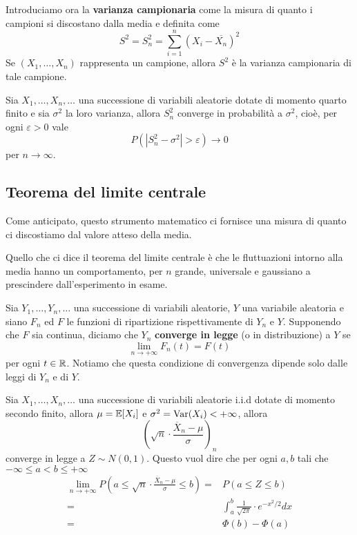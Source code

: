Introduciamo ora la \textbf{varianza campionaria} come la misura di quanto i campioni si
discostano dalla media e definita come
\[ S^2 = S_n^2 = \sum_{i=1}^n \left( X_i - \overline{X_n} \right)^2 \]
Se $(X_1, \dots, X_n)$ rappresenta un campione, allora $S^2$ è la varianza campionaria di tale
campione.

\begin{proposition}
	Sia $X_1, \dots, X_n, \dots$ una successione di variabili aleatorie dotate di momento quarto
	finito e sia $\sigma^2$ la loro varianza, allora $S_n^2$ converge in probabilità a $\sigma^2$,
	cioè, per ogni $\varepsilon > 0$ vale
	\[ P(|S_n^2 - \sigma^2| > \varepsilon) \to 0 \]
	per $n \to \infty$.
\end{proposition}

\subsection{Teorema del limite centrale}
Come anticipato, questo strumento matematico ci fornisce una misura di quanto ci discostiamo dal
valore atteso della media.

Quello che ci dice il teorema del limite centrale è che le fluttuazioni intorno alla media
hanno un comportamento, per $n$ grande, universale e gaussiano a prescindere dall'esperimento in
esame.

\begin{definition}
	Sia $Y_1, \dots, Y_n, \dots$ una successione di variabili aleatorie, $Y$ una variabile
	aleatoria e siano $F_n$ ed $F$ le funzioni di ripartizione rispettivamente di $Y_n$ e $Y$.
	Supponendo che $F$ sia continua, diciamo che $Y_n$ \textbf{converge in legge} (o in
	distribuzione) a $Y$ se
	\[ \lim_{n \to +\infty} F_n (t) = F(t) \]
	per ogni $t \in \mathbb{R}$. Notiamo che questa condizione di convergenza dipende solo dalle leggi di
	$Y_n$ e di $Y$.
\end{definition}

\begin{theorem}\label{th: tlc}
	Sia $X_1, \dots, X_n, \dots$ una successione di variabili aleatorie i.i.d dotate di momento
	secondo finito, allora $\mu = \mathbb{E}[X_i]$ e $\sigma^2 = \operatorname{Var}(X_i) < +\infty$, allora
	\[ \left( \sqrt{n} \cdot \frac{\overline{X}_n - \mu}{\sigma} \right)_n \]
	converge in legge a $Z \sim N(0,1)$. Questo vuol dire che per ogni $a, b$ tali che
	$-\infty \leq a < b \leq +\infty$
	\begin{align*}
		\lim_{n \to +\infty} P\left( a \leq \sqrt{n} \cdot \frac{\overline{X}_n - \mu}{\sigma}
		\leq b \right) = & P(a \leq Z \leq b)                                      \\
		=                & \int_{a}^{b} \frac{1}{\sqrt{2 \pi}} \cdot e^{-x^2/2} dx \\
		=                & \Phi(b) - \Phi(a)
	\end{align*}
\end{theorem}

